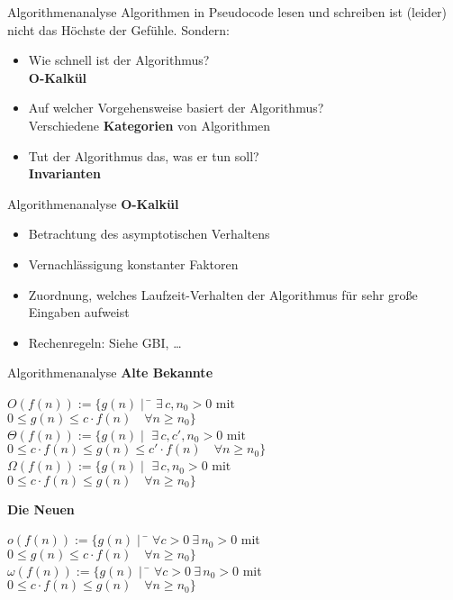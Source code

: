 \begin{frame}{Algorithmenanalyse}
	Algorithmen in Pseudocode lesen und schreiben ist (leider) nicht das Höchste der Gefühle. Sondern:
	\begin{itemize}[<+->]
		\item Wie schnell ist der Algorithmus? \\
			\impl \textbf{O-Kalkül}
		\item Auf welcher Vorgehensweise basiert der Algorithmus? \\
			\impl Verschiedene \textbf{Kategorien} von Algorithmen
		\item Tut der Algorithmus das, was er tun soll? \\
			\impl \textbf{Invarianten}
	\end{itemize}
\end{frame}


\begin{frame}{Algorithmenanalyse}
	\textbf{O-Kalkül} \\
	\begin{itemize}
		\item Betrachtung des asymptotischen Verhaltens
		\item Vernachlässigung konstanter Faktoren
		\item Zuordnung, welches Laufzeit-Verhalten der Algorithmus für sehr große Eingaben aufweist
		\item Rechenregeln: Siehe GBI, \dots
	\end{itemize}
\end{frame}


\begin{frame}{Algorithmenanalyse}
	\textbf{Alte Bekannte} \\ \vspace{-.7\baselineskip}
	\begin{tabbing}
		$O(f(n)) := \{ g(n) \mid $ \= $\exists\, c, n_0 > 0\text{ mit }$ \\
					\> $0 \leq g(n) \leq c \cdot f(n) \quad \forall n \geq n_0 \}$ \\
		$\Theta(f(n)) := \{ g(n) \mid $ \> $ \exists\, c, c', n_0 > 0\text{ mit }$ \\
					\> $0 \leq c \cdot f(n) \leq g(n) \leq c' \cdot f(n) \quad \forall n \geq n_0 \}$ \\
		$\Omega(f(n)) := \{ g(n) \mid $ \> $\exists\, c, n_0 > 0\text{ mit }$ \\
					\> $0 \leq c \cdot f(n) \leq g(n) \quad \forall n \geq n_0 \}$ 
	\end{tabbing} 
	\pause
	\smallskip
	\textbf{Die Neuen} \\ \vspace{-.7\baselineskip}
	\begin{tabbing}
		$o(f(n)) := \{g(n) \mid $ \= $\forall c > 0 \ \exists\, n_0 > 0$ mit \\
		\> $ 0 \leq g(n) \leq c \cdot f(n) \quad \forall n \geq n_0 \}$ \\
		$\omega (f(n)) := \{g(n) \mid $ \= $ \forall c > 0 \ \exists\, n_0 > 0$ mit \\
		\> $ 0 \leq c \cdot f(n) \leq g(n) \quad \forall n \geq n_0 \}$
	\end{tabbing}
\end{frame}


